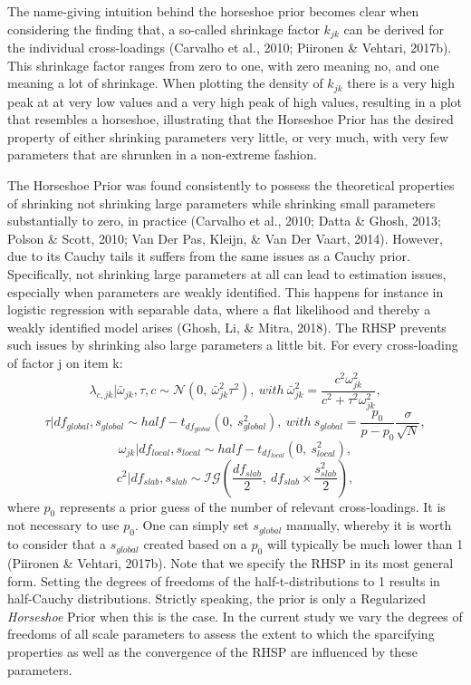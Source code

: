 \documentclass[
  man, donotrepeattitle,floatsintext]{apa6}
\begin{document}
The name-giving intuition behind the horseshoe prior becomes clear when considering the finding that, a so-called shrinkage factor \(k_{jk}\) can be derived for the individual cross-loadings (Carvalho et al., 2010; Piironen \& Vehtari, 2017b). This shrinkage factor ranges from zero to one, with zero meaning no, and one meaning a lot of shrinkage. When plotting the density of \(k_{jk}\) there is a very high peak at at very low values and a very high peak of high values, resulting in a plot that resembles a horseshoe, illustrating that the Horseshoe Prior has the desired property of either shrinking parameters very little, or very much, with very few parameters that are shrunken in a non-extreme fashion.

The Horseshoe Prior was found consistently to possess the theoretical properties of shrinking not shrinking large parameters while shrinking small parameters substantially to zero, in practice (Carvalho et al., 2010; Datta \& Ghosh, 2013; Polson \& Scott, 2010; Van Der Pas, Kleijn, \& Van Der Vaart, 2014). However, due to its Cauchy tails it suffers from the same issues as a Cauchy prior. Specifically, not shrinking large parameters at all can lead to estimation issues, especially when parameters are weakly identified. This happens for instance in logistic regression with separable data, where a flat likelihood and thereby a weakly identified model arises (Ghosh, Li, \& Mitra, 2018). The RHSP prevents such issues by shrinking also large parameters a little bit. For every cross-loading of factor j on item k:
\[\lambda_{c,jk} | \bar{\omega}_{jk}, \tau, c\sim \mathcal{N}(0, \ \bar{\omega}^2_{jk} \tau^2), \ with \ \bar{\omega}^2_{jk} = \frac{c^2\omega_{jk}^2}{c^2 + \tau^2 \omega_{jk}^2},\]
\[\tau | df_{global}, s_{global} \sim half-t_{df_{global}}(0,\  s_{global}^2), \ with \  s_{global} = \frac{p_0}{p-p_0}\frac{\sigma}{\sqrt{N}},\]
\[\omega_{jk}| df_{local}, s_{local} \sim half-t_{df_{local}}(0, \ s_{local}^2),\]
\[c^2 | df_{slab}, s_{slab} \sim \mathcal{IG}(\frac{df_{slab}}{2}, \  df_{slab} \times \frac{s_{slab}^2}{2}),\]
where \(p_0\) represents a prior guess of the number of relevant cross-loadings. It is not necessary to use \(p_0\). One can simply set \(s_{global}\) manually, whereby it is worth to consider that a \(s_{global}\) created based on a \(p_0\) will typically be much lower than 1 (Piironen \& Vehtari, 2017b). Note that we specify the RHSP in its most general form. Setting the degrees of freedoms of the half-t-distributions to 1 results in half-Cauchy distributions. Strictly speaking, the prior is only a Regularized \emph{Horseshoe} Prior when this is the case. In the current study we vary the degrees of freedoms of all scale parameters to assess the extent to which the sparcifying properties as well as the convergence of the RHSP are influenced by these parameters.
\end{document}
